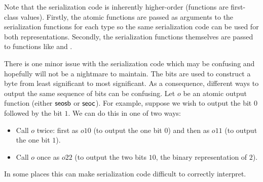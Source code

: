 Note that the serialization code is inherently higher-order (functions are first-class values).
Firstly, the atomic functions are passed as arguments to the serialization functions
for each type so the same serialization code can be used for both representations.
Secondly, the serialization functions themselves are passed to functions like 
and .

There is one minor issue with the serialization code which may be confusing
and hopefully will not be a nightmare to maintain.
The bits are used to construct a byte from least significant to most significant.
As a consequence, different ways to output the same sequence of bits can be confusing.
Let $o$ be an atomic output function (either ${\sf{seosb}}$ or ${\sf{seoc}}$).
For example, suppose we wish to output the bit $0$ followed by the bit $1$.
We can do this in one of two ways:
\begin{itemize}
\item Call $o$ twice: first as $o 1 0$ (to output the one bit $0$) and then as $o 1 1$ (to output the one bit $1$).
\item Call $o$ once as $o 2 2$ (to output the two bits $10$, the binary representation of $2$).
\end{itemize}
In some places this can make serialization code difficult to correctly interpret.

